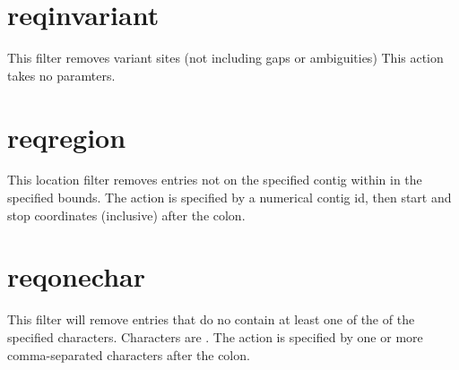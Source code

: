 \documentclass[letterpaper,11pt,english]{sphinxmanual}
\begin{document}
\section{reqinvariant}
\label{\detokenize{mvf_filter_modules:reqinvariant}}
This filter removes variant sites (not including gaps or ambiguities)
This action takes no paramters.

\begin{sphinxVerbatim}[commandchars=\\\{\}]
  
 
 
 
 
\end{sphinxVerbatim}


\section{reqregion}
\label{\detokenize{mvf_filter_modules:reqregion}}
This location filter removes entries not on the specified contig
within in the specified bounds.
The action is specified by a numerical contig id, then start and
stop coordinates (inclusive) after the colon.

\begin{sphinxVerbatim}[commandchars=\\\{\}]
  
 
 
 
\end{sphinxVerbatim}


\section{reqonechar}
\label{\detokenize{mvf_filter_modules:reqonechar}}
This filter will remove entries that do no contain at least
one of the of the specified  characters. Characters are
. The action is specified by one or more
comma-separated characters after the colon.
\end{document}
